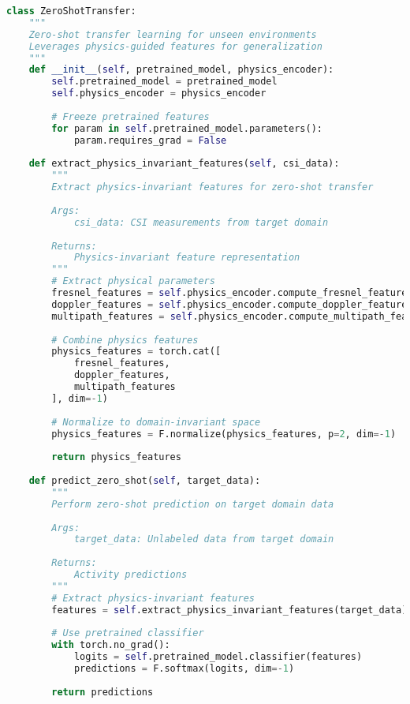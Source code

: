 \documentclass[journal]{IEEEtran}
\begin{document}
\begin{lstlisting}[language=Python, caption=Zero-Shot Transfer Implementation]
class ZeroShotTransfer:
    """
    Zero-shot transfer learning for unseen environments
    Leverages physics-guided features for generalization
    """
    def __init__(self, pretrained_model, physics_encoder):
        self.pretrained_model = pretrained_model
        self.physics_encoder = physics_encoder
        
        # Freeze pretrained features
        for param in self.pretrained_model.parameters():
            param.requires_grad = False
        
    def extract_physics_invariant_features(self, csi_data):
        """
        Extract physics-invariant features for zero-shot transfer
        
        Args:
            csi_data: CSI measurements from target domain
        
        Returns:
            Physics-invariant feature representation
        """
        # Extract physical parameters
        fresnel_features = self.physics_encoder.compute_fresnel_features(csi_data)
        doppler_features = self.physics_encoder.compute_doppler_features(csi_data)
        multipath_features = self.physics_encoder.compute_multipath_features(csi_data)
        
        # Combine physics features
        physics_features = torch.cat([
            fresnel_features,
            doppler_features,
            multipath_features
        ], dim=-1)
        
        # Normalize to domain-invariant space
        physics_features = F.normalize(physics_features, p=2, dim=-1)
        
        return physics_features
    
    def predict_zero_shot(self, target_data):
        """
        Perform zero-shot prediction on target domain data
        
        Args:
            target_data: Unlabeled data from target domain
        
        Returns:
            Activity predictions
        """
        # Extract physics-invariant features
        features = self.extract_physics_invariant_features(target_data)
        
        # Use pretrained classifier
        with torch.no_grad():
            logits = self.pretrained_model.classifier(features)
            predictions = F.softmax(logits, dim=-1)
        
        return predictions
\end{lstlisting}
\end{document}
